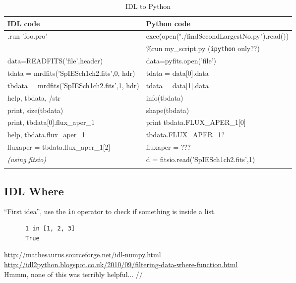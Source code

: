 \documentclass[11pt,a4paper]{article}
\begin{document}
\begin{table}
  \begin{center}
    \setlength{\tabcolsep}{4pt}
    \begin{tabular}{ll}
      \hline\hline
      IDL code   & Python code \\
      \hline 
      .run 'foo.pro'  & exec(open("./findSecondLargestNo.py").read())\\
                            & \%run my\_script.py  ({\tt ipython} only??)\\
      \hline
      data=READFITS('file',header) 	 & data=pyfits.open('file')\\
      tdata  = mrdfits('SpIESch1ch2.fits',0, hdr) 	 & tdata = data[0].data \\
      tbdata = mrdfits('SpIESch1ch2.fits',1, hdr) 	 & tdata = data[1].data \\
      help, tbdata, /str     & info(tbdata)\\
      print, size(tbdata)  & shape(tbdata)\\
      print, tbdata[0].flux\_aper\_1 & print tbdata.FLUX\_APER\_1[0]\\
      help, tbdata.flux\_aper\_1        & tbdata.FLUX\_APER\_1? \\
      fluxaper = tbdata.flux\_aper\_1[2] & fluxaper = ??? \\
      \hline 
     {\it (using fitsio)} & d = fitsio.read('SpIESch1ch2.fits',1) \\
      \hline
      \label{tab:IDL2Python}
    \end{tabular}
    \caption{IDL to Python}
    \label{table:idl_vs_python}
  \end{center}
\end{table}


    \subsection{IDL Where}
    ``First idea'', use the {\tt in} operator to check if something is inside a list.
    \begin{lstlisting}
      1 in [1, 2, 3]
      True
     \end{lstlisting}



    \href{http://mathesaurus.sourceforge.net/idl-numpy.html}{http://mathesaurus.sourceforge.net/idl-numpy.html}\\
    \href{http://idl2python.blogspot.co.uk/2010/09/filtering-data-where-function.html}{http://idl2python.blogspot.co.uk/2010/09/filtering-data-where-function.html}\\
    Hmmm, none of this was terribly helpful... //
    
\end{document}
